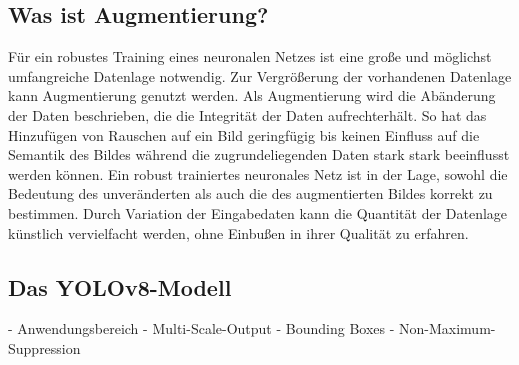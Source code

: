 

\subsection{Was ist Augmentierung?}
\label{sec:was_augmentierung}

Für ein robustes Training eines neuronalen Netzes ist eine große und möglichst umfangreiche Datenlage notwendig. Zur Vergrößerung der vorhandenen Datenlage kann Augmentierung genutzt werden. Als Augmentierung wird die Abänderung der Daten beschrieben, die die Integrität der Daten aufrechterhält. So hat das Hinzufügen von Rauschen auf ein Bild geringfügig bis keinen Einfluss auf die Semantik des Bildes während die zugrundeliegenden Daten stark stark beeinflusst werden können. Ein robust trainiertes neuronales Netz ist in der Lage, sowohl die Bedeutung des unveränderten als auch die des augmentierten Bildes korrekt zu bestimmen. Durch Variation der Eingabedaten kann die Quantität der Datenlage künstlich vervielfacht werden, ohne Einbußen in ihrer Qualität zu erfahren.



\subsection{Das YOLOv8-Modell}
\label{sec:yolov8}

- Anwendungsbereich
- Multi-Scale-Output
- Bounding Boxes
- Non-Maximum-Suppression

\todo{}

